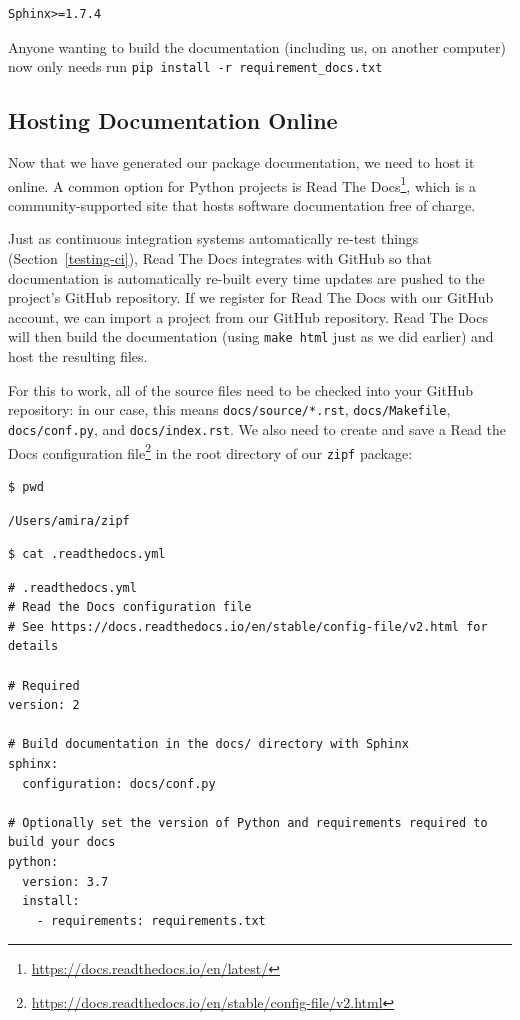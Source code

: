 \documentclass[
]{krantz}
\renewcommand{\href}[2]{#2\footnote{\url{#1}}}
\begin{document}
\begin{verbatim}
Sphinx>=1.7.4
\end{verbatim}

Anyone wanting to build the documentation (including us, on another computer)
now only needs run \texttt{pip\ install\ -r\ requirement\_docs.txt}

\hypertarget{packaging-rtd}{%
\subsection{Hosting Documentation Online}\label{packaging-rtd}}

Now that we have generated our package documentation,
we need to host it online.
A common option for Python projects is \href{https://docs.readthedocs.io/en/latest/}{Read The Docs},
which is a community-supported site that hosts software documentation free of charge.

Just as continuous integration systems automatically re-test things (Section~\ref{testing-ci}),
Read The Docs integrates with GitHub
so that documentation is automatically re-built
every time updates are pushed to the project's GitHub repository.
If we register for Read The Docs with our GitHub account,
we can import a project from our GitHub repository.
Read The Docs will then build the documentation
(using \texttt{make\ html} just as we did earlier)
and host the resulting files.

For this to work,
all of the source files
need to be checked into your GitHub repository:
in our case,
this means \texttt{docs/source/*.rst},
\texttt{docs/Makefile},
\texttt{docs/conf.py},
and \texttt{docs/index.rst}.
We also need to create and save a
\href{https://docs.readthedocs.io/en/stable/config-file/v2.html}{Read the Docs configuration file}
in the root directory of our \texttt{zipf} package:

\begin{verbatim}
$ pwd
\end{verbatim}

\begin{verbatim}
/Users/amira/zipf
\end{verbatim}

\begin{verbatim}
$ cat .readthedocs.yml
\end{verbatim}

\begin{verbatim}
# .readthedocs.yml
# Read the Docs configuration file
# See https://docs.readthedocs.io/en/stable/config-file/v2.html for details

# Required
version: 2

# Build documentation in the docs/ directory with Sphinx
sphinx:
  configuration: docs/conf.py

# Optionally set the version of Python and requirements required to build your docs
python:
  version: 3.7
  install:
    - requirements: requirements.txt
\end{verbatim}
\end{document}
